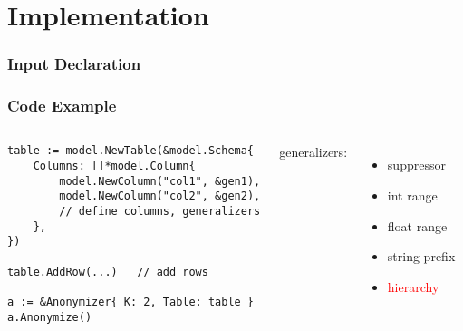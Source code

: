 \section{Implementation}

\begin{frame}
    \frametitle{Input Declaration}
    
\end{frame}

\begin{frame}[fragile]
  \frametitle{Code Example}
  \begin{columns}
  \scriptsize
  \begin{lstlisting}
table := model.NewTable(&model.Schema{
    Columns: []*model.Column{
        model.NewColumn("col1", &gen1),
        model.NewColumn("col2", &gen2),
        // define columns, generalizers
    },
})

table.AddRow(...)   // add rows

a := &Anonymizer{ K: 2, Table: table }
a.Anonymize()
  \end{lstlisting}
  generalizers:
  \begin{itemize}
    \item suppressor
    \item int range
    \item float range
    \item string prefix
    \item \textcolor{red}{hierarchy}
  \end{itemize}
  \end{columns}
\end{frame}
